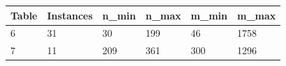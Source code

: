 \begin{tabular}{llllll}
\hline
Table & Instances & n\_min & n\_max & m\_min & m\_max \\
\hline
6 & 31 & 30 & 199 & 46 & 1758 \\
7 & 11 & 209 & 361 & 300 & 1296 \\
\hline
\end{tabular}
